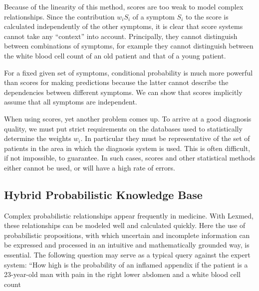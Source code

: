 \documentclass[10pt]{book}
\begin{document}
Because of the linearity of this method, scores are too weak to model complex relationships. Since the contribution $w_{i}S_{i}$ of a symptom $S_{i}$ to the score is calculated independently of the other symptoms, it is clear that score systems cannot take any ``context'' into account. Principally, they cannot distinguish between combinations of symptoms, for example they cannot distinguish between the white blood cell count of an old patient and that of a young patient.

For a fixed given set of symptoms, conditional probability is much more powerful than scores for making predictions because the latter cannot describe the dependencies between different symptoms. We can show that scores implicitly assume that all symptoms are independent.

When using scores, yet another problem comes up. To arrive at a good diagnosis quality, we must put strict requirements on the databases used to statistically determine the weights $w_{i}$. In particular they must be representative of the set of patients in the area in which the diagnosis system is used. This is often difficult, if not impossible, to guarantee. In such cases, scores and other statistical methods either cannot be used, or will have a high rate of errors.

\subsection{Hybrid Probabilistic Knowledge Base}
Complex probabilistic relationships appear frequently in medicine. With Lexmed, these relationships can be modeled well and calculated quickly. Here the use of probabilistic propositions, with which uncertain and incomplete information can be expressed and processed in an intuitive and mathematically grounded way, is essential. The following question may serve as a typical query against the expert system: ``How high is the probability of an inflamed appendix if the patient is a 23-year-old man with pain in the right lower abdomen and a white blood cell count
\end{document}
